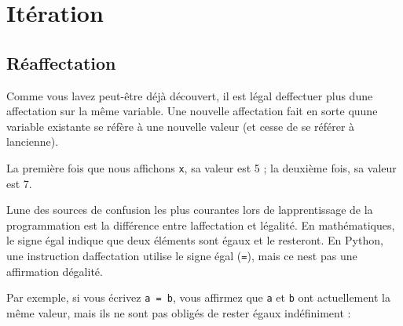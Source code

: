 \hypertarget{ituxe9ration}{%
\section{Itération}\label{ituxe9ration}}

\hypertarget{ruxe9affectation}{%
\subsection{Réaffectation}\label{ruxe9affectation}}

Comme vous l\textquotesingle avez peut-être déjà découvert, il est légal
d\textquotesingle effectuer plus d\textquotesingle une affectation sur
la même variable. Une nouvelle affectation fait en sorte
qu\textquotesingle une variable existante se réfère à une nouvelle
valeur (et cesse de se référer à l\textquotesingle ancienne).

\begin{Shaded}
\begin{Highlighting}[]
\OperatorTok{\textgreater{}\textgreater{}\textgreater{}}\OperatorTok{=} 
\OperatorTok{\textgreater{}\textgreater{}\textgreater{}}
\OperatorTok{\textgreater{}\textgreater{}\textgreater{}}\OperatorTok{=} 
\OperatorTok{\textgreater{}\textgreater{}\textgreater{}}
\end{Highlighting}
\end{Shaded}

La première fois que nous affichons \texttt{x}, sa valeur est 5 ; la
deuxième fois, sa valeur est 7.

L\textquotesingle une des sources de confusion les plus courantes lors
de l\textquotesingle apprentissage de la programmation est la différence
entre l\textquotesingle affectation et l\textquotesingle égalité. En
mathématiques, le signe égal indique que deux éléments sont égaux et le
resteront. En Python, une instruction d\textquotesingle affectation
utilise le signe égal (\texttt{=}), mais ce n\textquotesingle est pas
une affirmation d\textquotesingle égalité.

Par exemple, si vous écrivez \texttt{a\ =\ b}, vous affirmez que
\texttt{a} et \texttt{b} ont actuellement la même valeur, mais ils ne
sont pas obligés de rester égaux indéfiniment :

\begin{Shaded}
\begin{Highlighting}[]
\OperatorTok{=} 
\OperatorTok{=}
\OperatorTok{=}     
\end{Highlighting}
\end{Shaded}

